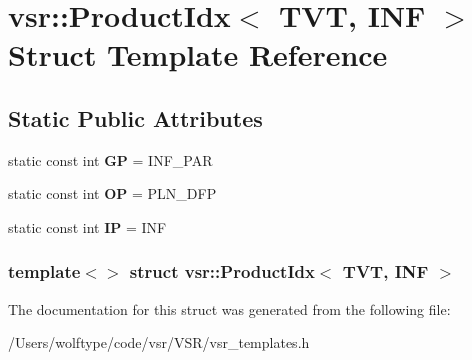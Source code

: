 \hypertarget{structvsr_1_1_product_idx_3_01_t_v_t_00_01_i_n_f_01_4}{\section{vsr\-:\-:Product\-Idx$<$ T\-V\-T, I\-N\-F $>$ Struct Template Reference}
\label{structvsr_1_1_product_idx_3_01_t_v_t_00_01_i_n_f_01_4}
}
\subsection*{Static Public Attributes}
\begin{DoxyCompactItemize}
\item 
\hypertarget{structvsr_1_1_product_idx_3_01_t_v_t_00_01_i_n_f_01_4_a6723c02de49039ed9469220ef32cbc36}{static const int {\bfseries G\-P} = I\-N\-F\-\_\-\-P\-A\-R}\label{structvsr_1_1_product_idx_3_01_t_v_t_00_01_i_n_f_01_4_a6723c02de49039ed9469220ef32cbc36}

\item 
\hypertarget{structvsr_1_1_product_idx_3_01_t_v_t_00_01_i_n_f_01_4_a0fe6e8786380eba1098b4bd9e11db6e8}{static const int {\bfseries O\-P} = P\-L\-N\-\_\-\-D\-F\-P}\label{structvsr_1_1_product_idx_3_01_t_v_t_00_01_i_n_f_01_4_a0fe6e8786380eba1098b4bd9e11db6e8}

\item 
\hypertarget{structvsr_1_1_product_idx_3_01_t_v_t_00_01_i_n_f_01_4_a6bc89fb5637faeff81120d6df0399a75}{static const int {\bfseries I\-P} = I\-N\-F}\label{structvsr_1_1_product_idx_3_01_t_v_t_00_01_i_n_f_01_4_a6bc89fb5637faeff81120d6df0399a75}

\end{DoxyCompactItemize}
\subsubsection*{template$<$$>$ struct vsr\-::\-Product\-Idx$<$ T\-V\-T, I\-N\-F $>$}



The documentation for this struct was generated from the following file\-:\begin{DoxyCompactItemize}
\item 
/\-Users/wolftype/code/vsr/\-V\-S\-R/vsr\-\_\-templates.\-h\end{DoxyCompactItemize}

